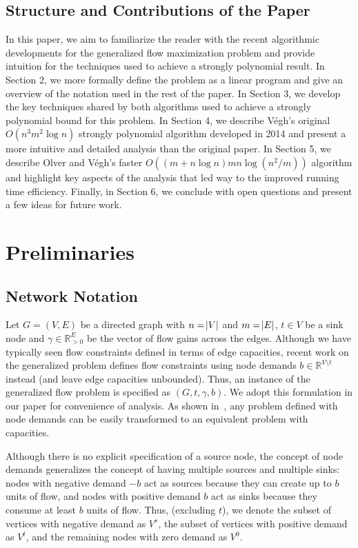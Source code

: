\documentclass[11pt]{article}
\theoremstyle{definition}
\theoremstyle{definition}
\newcommand{\R}{\mathbb{R}}
\newcommand{\vsrc}{V^{s}}
\newcommand{\vsink}{V^{t}}
\newcommand{\vz}{V^{0}}
\newcommand{\todo}[1]{}%
\begin{document}
	\subsection{Structure and Contributions of the Paper}\label{sec:structure}
	In this paper, we aim to
	familiarize the reader with the recent algorithmic developments for the
	generalized flow maximization problem and provide intuition for the techniques
	used to achieve a strongly polynomial result. In Section 2, we more formally
	define the problem as a linear program and give an overview of the notation
	used in the rest of the paper. In Section 3, we develop the key techniques
	shared by both algorithms used to achieve a strongly polynomial bound for this
	problem. In Section 4, we describe Végh's original $O(n^3m^2 \log n)$ strongly
	polynomial algorithm developed in 2014 and present a more intuitive and
	detailed analysis than the original paper. In Section 5, we describe Olver and
	Végh's faster $O((m + n\log n)mn\log(n^2 / m))$ algorithm and highlight key
	aspects of the analysis that led way to the improved running time efficiency.
	Finally, in Section 6, we conclude with open questions and present a few ideas
	for future work.
	\todo{Update when we're done.}
    
\section{Preliminaries}\label{sec:prelim}

	\subsection{Network Notation}\label{sec:notation}
	Let $G=(V,E)$ be a directed graph with $n=\abs{V}$ and $m=\abs{E}$,
	$t \in V$ be a sink node and $\gamma \in \R_{>0}^E$ be the vector of flow gains
	across the edges. Although we have typically seen flow constraints defined in terms of
	edge capacities, recent work on the generalized problem defines flow
	constraints using node demands $b \in \R^{V \setminus t}$ instead (and leave
	edge capacities unbounded). Thus, an instance of the generalized flow problem
	is specified as $(G, t, \gamma, b)$.
	We adopt this formulation in our paper for
	convenience of analysis. As shown in~\cite{Vegh2013}, any problem defined with
	node demands can be easily transformed to an equivalent problem with
	capacities. 

	Although there is no explicit specification of a source node, the concept of
	node demands generalizes the concept of having multiple sources and multiple
	sinks: nodes with negative demand $-b$ act as sources because they can create
	up to $b$ units of flow, and nodes with positive demand $b$ act as sinks 
	because they consume at least $b$ units of flow. Thus, (excluding $t$), we denote the subset of
	vertices with negative demand as $\vsrc$, the subset of vertices with positive
	demand as $\vsink$, and the remaining nodes with zero demand as $\vz$.
\end{document}
